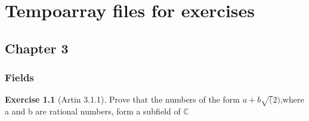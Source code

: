 \documentclass[
]{book}
\theoremstyle{definition}
\theoremstyle{definition}
\theoremstyle{definition}
\newtheorem{exercise}{Exercise}[chapter]
\theoremstyle{definition}
\theoremstyle{remark}
\begin{document}
\hypertarget{tempoarray-files-for-exercises}{%
\chapter{Tempoarray files for exercises}\label{tempoarray-files-for-exercises}}

\hypertarget{chapter-3}{%
\section{Chapter 3}\label{chapter-3}}

\hypertarget{fields-1}{%
\subsection{Fields}\label{fields-1}}

\begin{exercise}[Artin 3.1.1]
\protect\hypertarget{exr:unnamed-chunk-248}{}\label{exr:unnamed-chunk-248}Prove that the numbers of the form \(a + b\sqrt(2)\),where a and b are rational numbers, form a subfield of \(\mathbb{C}\)
\end{exercise}
\end{document}
